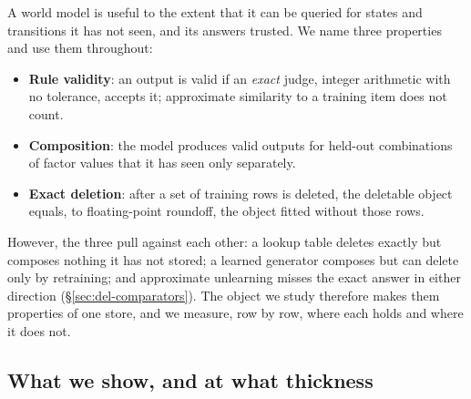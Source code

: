 \documentclass{article} %
\begin{document}
A world model is useful to the extent that it can be queried for states and transitions it has
not seen, and its answers trusted. We name three properties and use them throughout:
\begin{itemize}[leftmargin=*,nosep]
\item \textbf{Rule validity}: an output is valid if an \emph{exact} judge, integer arithmetic
  with no tolerance, accepts it; approximate similarity to a training item does not count.
\item \textbf{Composition}: the model produces valid outputs for held-out combinations of
  factor values that it has seen only separately.
\item \textbf{Exact deletion}: after a set of training rows is deleted, the deletable object
  equals, to floating-point roundoff, the object fitted without those rows.
\end{itemize}
However, the three pull against each other: a lookup table deletes exactly but
composes nothing it has not stored; a learned generator composes but can delete only by
retraining; and approximate unlearning misses the exact answer in either direction
(\S\ref{sec:del-comparators}). The object we study therefore makes them properties of one store, and we measure, row by row, where each holds and where it does not.

\subsection{What we show, and at what thickness}
\label{sec:contrib}
\end{document}
